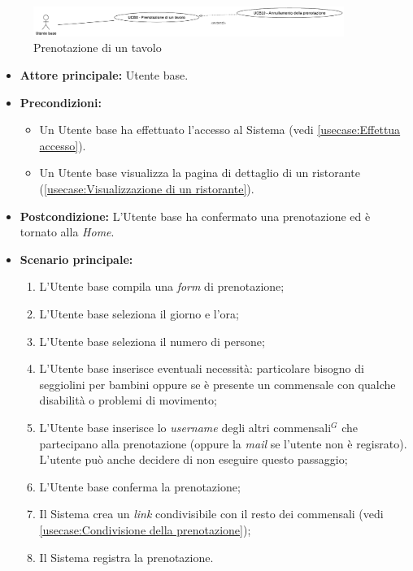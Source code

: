 \label{usecase:Prenotazione di un tavolo}

\begin{figure}[h]
	\centering
	\includegraphics[width=0.9\textwidth]{./uml/UCB8-10.png} 
	\caption{Prenotazione di un tavolo}
	\label{fig:UCB8-10}
  \end{figure}

\begin{itemize}
	\item \textbf{Attore principale:} Utente base.
	\item \textbf{Precondizioni:}
	      \begin{itemize}
		      \item Un Utente base ha effettuato l'accesso al Sistema (vedi \autoref{usecase:Effettua accesso}).
		      \item Un Utente base visualizza la pagina di dettaglio di un ristorante (\autoref{usecase:Visualizzazione di un ristorante}).
	      \end{itemize}
	\item \textbf{Postcondizione:} L'Utente base ha confermato una prenotazione ed è tornato alla \textit{Home}.


	\item \textbf{Scenario principale:}
	      \begin{enumerate}
		      \item L'Utente base compila una \textit{form} di prenotazione;
		      \item L'Utente base seleziona il giorno e l'ora;
		      \item L'Utente base seleziona il numero di persone;
		      \item L'Utente base inserisce eventuali necessità: particolare bisogno di seggiolini per bambini oppure se è presente un commensale con qualche disabilità o problemi di movimento;
		      \item L'Utente base inserisce lo \textit{username} degli altri commensali$^G$  che partecipano alla prenotazione (oppure la \textit{mail} se l'utente non è regisrato).
		            L'utente può anche decidere di non eseguire questo passaggio;
		      \item L'Utente base conferma la prenotazione;
		      \item Il Sistema crea un \textit{link} condivisibile con il resto dei commensali (vedi \autoref{usecase:Condivisione della prenotazione});
		      \item Il Sistema registra la prenotazione.


\end{enumerate}
\end{itemize}
